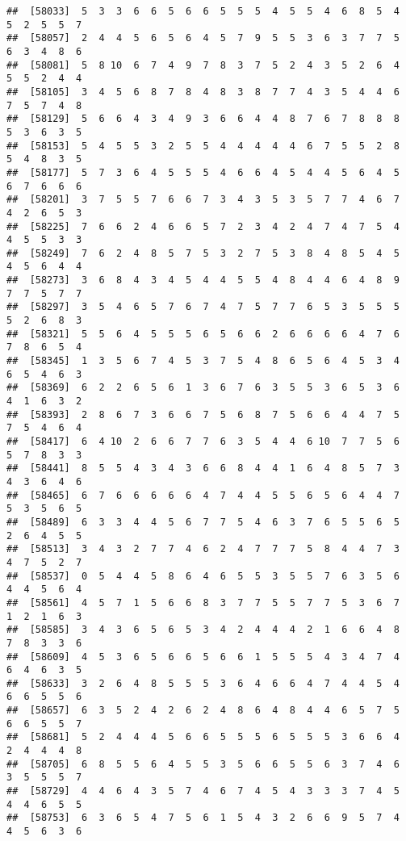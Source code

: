 \documentclass[
]{book}
\begin{document}
\begin{verbatim}
##  [58033]  5  3  3  6  6  5  6  6  5  5  5  4  5  5  4  6  8  5  4  5  2  5  5  7
##  [58057]  2  4  4  5  6  5  6  4  5  7  9  5  5  3  6  3  7  7  5  6  3  4  8  6
##  [58081]  5  8 10  6  7  4  9  7  8  3  7  5  2  4  3  5  2  6  4  5  5  2  4  4
##  [58105]  3  4  5  6  8  7  8  4  8  3  8  7  7  4  3  5  4  4  6  7  5  7  4  8
##  [58129]  5  6  6  4  3  4  9  3  6  6  4  4  8  7  6  7  8  8  8  5  3  6  3  5
##  [58153]  5  4  5  5  3  2  5  5  4  4  4  4  4  6  7  5  5  2  8  5  4  8  3  5
##  [58177]  5  7  3  6  4  5  5  5  4  6  6  4  5  4  4  5  6  4  5  6  7  6  6  6
##  [58201]  3  7  5  5  7  6  6  7  3  4  3  5  3  5  7  7  4  6  7  4  2  6  5  3
##  [58225]  7  6  6  2  4  6  6  5  7  2  3  4  2  4  7  4  7  5  4  4  5  5  3  3
##  [58249]  7  6  2  4  8  5  7  5  3  2  7  5  3  8  4  8  5  4  5  4  5  6  4  4
##  [58273]  3  6  8  4  3  4  5  4  4  5  5  4  8  4  4  6  4  8  9  7  7  5  7  7
##  [58297]  3  5  4  6  5  7  6  7  4  7  5  7  7  6  5  3  5  5  5  5  2  6  8  3
##  [58321]  5  5  6  4  5  5  5  6  5  6  6  2  6  6  6  6  4  7  6  7  8  6  5  4
##  [58345]  1  3  5  6  7  4  5  3  7  5  4  8  6  5  6  4  5  3  4  6  5  4  6  3
##  [58369]  6  2  2  6  5  6  1  3  6  7  6  3  5  5  3  6  5  3  6  4  1  6  3  2
##  [58393]  2  8  6  7  3  6  6  7  5  6  8  7  5  6  6  4  4  7  5  7  5  4  6  4
##  [58417]  6  4 10  2  6  6  7  7  6  3  5  4  4  6 10  7  7  5  6  5  7  8  3  3
##  [58441]  8  5  5  4  3  4  3  6  6  8  4  4  1  6  4  8  5  7  3  4  3  6  4  6
##  [58465]  6  7  6  6  6  6  6  4  7  4  4  5  5  6  5  6  4  4  7  5  3  5  6  5
##  [58489]  6  3  3  4  4  5  6  7  7  5  4  6  3  7  6  5  5  6  5  2  6  4  5  5
##  [58513]  3  4  3  2  7  7  4  6  2  4  7  7  7  5  8  4  4  7  3  4  7  5  2  7
##  [58537]  0  5  4  4  5  8  6  4  6  5  5  3  5  5  7  6  3  5  6  4  4  5  6  4
##  [58561]  4  5  7  1  5  6  6  8  3  7  7  5  5  7  7  5  3  6  7  1  2  1  6  3
##  [58585]  3  4  3  6  5  6  5  3  4  2  4  4  4  2  1  6  6  4  8  7  8  3  3  6
##  [58609]  4  5  3  6  5  6  6  5  6  6  1  5  5  5  4  3  4  7  4  6  4  6  3  5
##  [58633]  3  2  6  4  8  5  5  5  3  6  4  6  6  4  7  4  4  5  4  6  6  5  5  6
##  [58657]  6  3  5  2  4  2  6  2  4  8  6  4  8  4  4  6  5  7  5  6  6  5  5  7
##  [58681]  5  2  4  4  4  5  6  6  5  5  5  6  5  5  5  3  6  6  4  2  4  4  4  8
##  [58705]  6  8  5  5  6  4  5  5  3  5  6  6  5  5  6  3  7  4  6  3  5  5  5  7
##  [58729]  4  4  6  4  3  5  7  4  6  7  4  5  4  3  3  3  7  4  5  4  4  6  5  5
##  [58753]  6  3  6  5  4  7  5  6  1  5  4  3  2  6  6  9  5  7  4  4  5  6  3  6

\end{verbatim}
\end{document}
